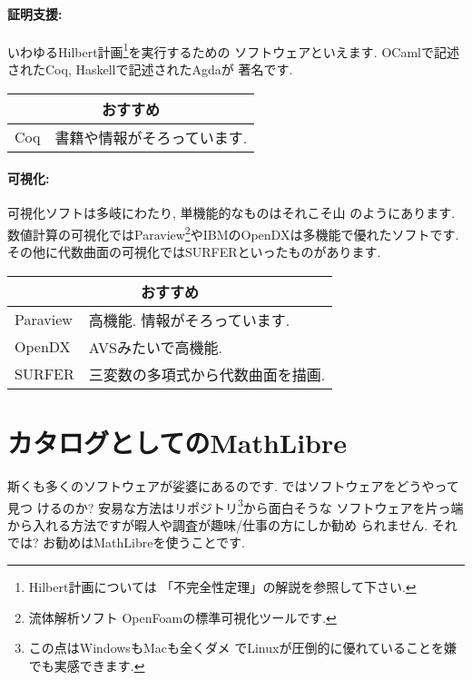 \documentclass[b5j,8pt,twocolumn]{ltjsarticle}
\begin{document}
\paragraph{証明支援:} いわゆるHilbert計画\footnote{Hilbert計画については
「不完全性定理」\cite{林}の解説を参照して下さい.}を実行するための
ソフトウェアといえます. OCamlで記述されたCoq, Haskellで記述されたAgdaが
著名です.

\vspace{0.5cm}
{\footnotesize
\begin{tabularx}{7cm}{l X}
\multicolumn{2}{c}{おすすめ}\\\hline
Coq& 書籍や情報がそろっています.\\\hline
\end{tabularx}
}
\vspace{0.5cm}

\paragraph{可視化:} 可視化ソフトは多岐にわたり, 単機能的なものはそれこそ山
のようにあります. 数値計算の可視化ではParaview\footnote{流体解析ソフト
OpenFoamの標準可視化ツールです.}やIBMのOpenDXは多機能で優れたソフトです.
 その他に代数曲面の可視化ではSURFERといったものがあります.

\vspace{0.5cm}
{\footnotesize
\begin{tabularx}{8cm}{l X}
\multicolumn{2}{c}{おすすめ}\\\hline
Paraview& 高機能. 情報がそろっています.\\
OpenDX& AVSみたいで高機能.\\
SURFER& 三変数の多項式から代数曲面を描画.\\\hline
\end{tabularx}
}
\vspace{0.5cm}

\section{カタログとしてのMathLibre}

斯くも多くのソフトウェアが娑婆にあるのです. ではソフトウェアをどうやって見つ
けるのか? 安易な方法はリポジトリ\footnote{この点はWindowsもMacも全くダメ
でLinuxが圧倒的に優れていることを嫌でも実感できます.}から面白そうな
ソフトウェアを片っ端から入れる方法ですが暇人や調査が趣味/仕事の方にしか勧め
られません. それでは? お勧めはMathLibreを使うことです.
\newline
\end{document}
